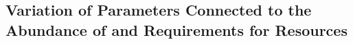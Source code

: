 \subsection{Variation of Parameters Connected to the Abundance of and Requirements for Resources}


